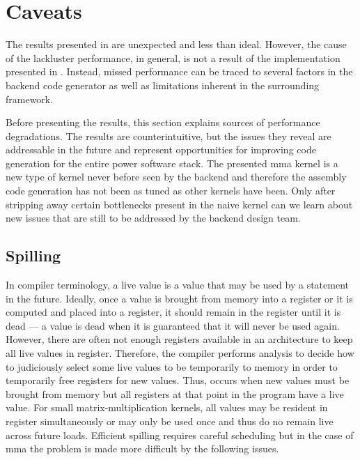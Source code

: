 \documentclass[\main/thesis.tex]{subfiles}
\begin{document}
\section{Caveats}
\label{sec:caveats}
The results presented in  are unexpected and less than ideal.
However, the cause of the lackluster performance, in general, is not a result of the implementation presented in .
Instead, missed performance can be traced to several factors in the backend code generator as well as limitations inherent in the surrounding framework.

Before presenting the results, this section explains sources of performance degradations.
The results are counterintuitive, but the issues they reveal are addressable in the future and represent opportunities for improving code generation for the entire \gls{power} software stack.
The presented \gls{mma} kernel is a new type of kernel never before seen by the backend and therefore the assembly code generation has not been as tuned as other kernels have been.
Only after stripping away certain bottlenecks present in the naive kernel can we learn about new issues that are still to be addressed by the backend design team.

\subsection{Spilling}
In compiler terminology, a \gls{live} value is a value that may be used by a statement in the future.
Ideally, once a value is brought from memory into a register or it is computed and placed into a register, it should remain in the register until it is \gls{dead} --- a value is dead when it is guaranteed that it will never be used again.
However, there are often not enough registers available in an architecture to keep all live values in register.
Therefore, the compiler performs analysis to decide how to judiciously select some live values to be temporarily  to memory in order to temporarily free registers for new values.
Thus,  occurs when new values must be brought from memory but all registers at that \gls{point} in the program have a \gls{live} value.
For small matrix-multiplication kernels, all values may be resident in register simultaneously or may only be used once and thus do no remain \gls{live} across future loads.
Efficient spilling requires careful scheduling but in the case of \gls{mma} the problem is made more difficult by the following issues.
\end{document}
